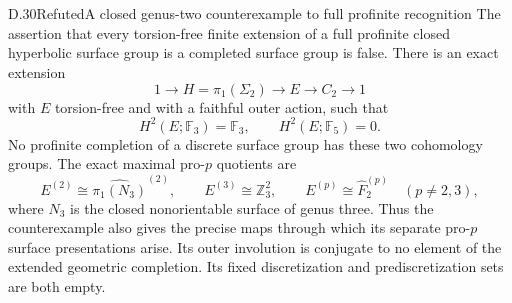 \begin{claim}{D.30}{Refuted}{A closed genus-two counterexample to full profinite recognition}
The assertion that every torsion-free finite extension of a full
profinite closed hyperbolic surface group is a completed surface group
is false.  There is an exact extension
\[
 1\longrightarrow H=\widehat\pi_1(\Sigma_2)
 \longrightarrow E\longrightarrow C_2\longrightarrow1
                                                        \tag{D.30.1}
\]
with $E$ torsion-free and with a faithful outer action, such that
\[
 H^2(E;\mathbb F_3)=\mathbb F_3,\qquad
 H^2(E;\mathbb F_5)=0.                                  \tag{D.30.2}
\]
No profinite completion of a discrete surface group has these two
cohomology groups.  The exact maximal pro-$p$ quotients are
\[
 E^{(2)}\cong\widehat{\pi_1(N_3)}^{(2)},\qquad
 E^{(3)}\cong\mathbb Z_3^2,\qquad
 E^{(p)}\cong\widehat F_2^{(p)}\quad(p\ne2,3),           \tag{D.30.3}
\]
where $N_3$ is the closed nonorientable surface of genus three.
Thus the counterexample also gives the precise maps through which
its separate pro-$p$ surface presentations arise.
Its outer involution is conjugate to no element of the extended
geometric completion. Its fixed discretization and
prediscretization sets are both empty.
\end{claim}
